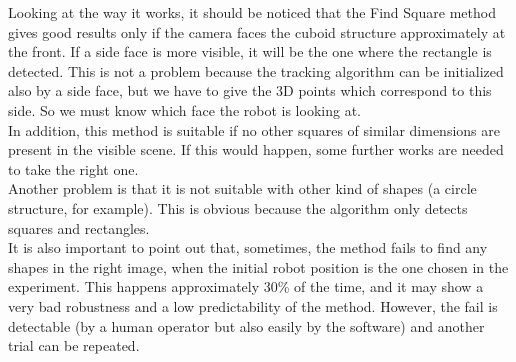 Looking at the way it works, it should be noticed that the Find Square method gives good results only if the camera faces the cuboid structure approximately at the front. If a side face is more visible, it will be the one where the rectangle is detected. This is not a problem because the tracking algorithm can be initialized also by a side face, but we have to give the 3D points which correspond to this side. So we must know which face the robot is looking at.\\

In addition, this method is suitable if no other squares of similar dimensions are present in the visible scene. If this would happen, some further works are needed to take the right one.\\
 
Another problem is that it is not suitable with other kind of shapes (a circle structure, for example). This is obvious because the algorithm only detects squares and rectangles.\\ 

It is also important to point out that, sometimes, the method fails to find any shapes in the right image, when the initial robot position is the one chosen in the experiment. This happens approximately 30\% of the time, and it may show a very bad robustness and a low predictability of the method. However, the fail is detectable (by a human operator but also easily by the software) and another trial can be repeated.\\

